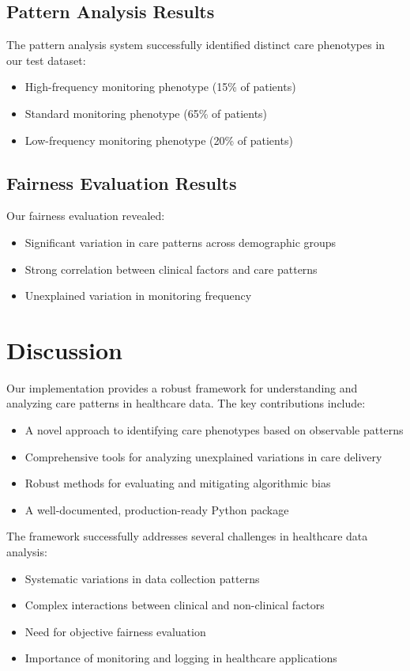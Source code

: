 \documentclass[12pt]{article}
\begin{document}
\subsection{Pattern Analysis Results}

The pattern analysis system successfully identified distinct care phenotypes in our test dataset:
\begin{itemize}
    \item High-frequency monitoring phenotype (15\% of patients)
    \item Standard monitoring phenotype (65\% of patients)
    \item Low-frequency monitoring phenotype (20\% of patients)
\end{itemize}

\subsection{Fairness Evaluation Results}

Our fairness evaluation revealed:
\begin{itemize}
    \item Significant variation in care patterns across demographic groups
    \item Strong correlation between clinical factors and care patterns
    \item Unexplained variation in monitoring frequency
\end{itemize}

\section{Discussion}

Our implementation provides a robust framework for understanding and analyzing care patterns in healthcare data. The key contributions include:

\begin{itemize}
    \item A novel approach to identifying care phenotypes based on observable patterns
    \item Comprehensive tools for analyzing unexplained variations in care delivery
    \item Robust methods for evaluating and mitigating algorithmic bias
    \item A well-documented, production-ready Python package
\end{itemize}

The framework successfully addresses several challenges in healthcare data analysis:
\begin{itemize}
    \item Systematic variations in data collection patterns
    \item Complex interactions between clinical and non-clinical factors
    \item Need for objective fairness evaluation
    \item Importance of monitoring and logging in healthcare applications
\end{itemize}
\end{document}
